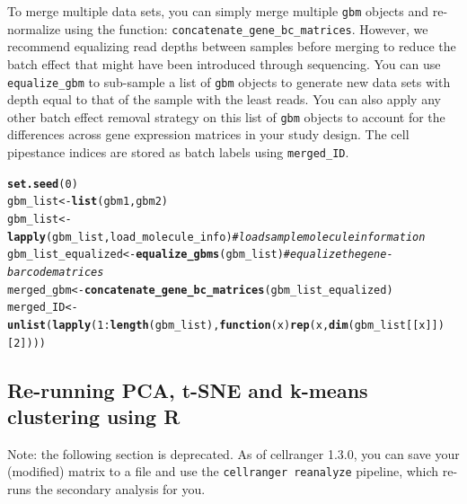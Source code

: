 \documentclass[10pt,oneside]{article}\usepackage[]{graphicx}\usepackage[]{color}
\makeatletter
\newcommand{\hlnum}[1]{\textcolor[rgb]{0.686,0.059,0.569}{#1}}%
\newcommand{\hlcom}[1]{\textcolor[rgb]{0.678,0.584,0.686}{\textit{#1}}}%
\newcommand{\hlopt}[1]{\textcolor[rgb]{0,0,0}{#1}}%
\newcommand{\hlstd}[1]{\textcolor[rgb]{0.345,0.345,0.345}{#1}}%
\newcommand{\hlkwa}[1]{\textcolor[rgb]{0.161,0.373,0.58}{\textbf{#1}}}%
\newcommand{\hlkwb}[1]{\textcolor[rgb]{0.69,0.353,0.396}{#1}}%
\newcommand{\hlkwc}[1]{\textcolor[rgb]{0.333,0.667,0.333}{#1}}%
\newcommand{\hlkwd}[1]{\textcolor[rgb]{0.737,0.353,0.396}{\textbf{#1}}}%
\newenvironment{kframe}{%
 \def\at@end@of@kframe{}%
 \ifinner\ifhmode%
  \def\at@end@of@kframe{\end{minipage}}%
  \begin{minipage}{\columnwidth}%
 \fi\fi%
 \def\FrameCommand##1{\hskip\@totalleftmargin \hskip-\fboxsep
 \colorbox{shadecolor}{##1}\hskip-\fboxsep
     \hskip-\linewidth \hskip-\@totalleftmargin \hskip\columnwidth}%
 \MakeFramed {\advance\hsize-\width
   \@totalleftmargin\z@ \linewidth\hsize
   \@setminipage}}%
 {\par\unskip\endMakeFramed%
 \at@end@of@kframe}
\newenvironment{knitrout}{}{} %
\makeatother
\begin{document}
To merge multiple data sets, you can simply merge multiple \verb!gbm! objects and re-normalize using the function: \verb!concatenate_gene_bc_matrices!. However, we recommend equalizing read depths between samples before merging to reduce the batch effect that might have been introduced through sequencing. You can use \verb!equalize_gbm! to sub-sample a list of \verb!gbm! objects to generate new data sets with depth equal to that of the sample with the least reads. You can also apply any other batch effect removal strategy on this list of \verb!gbm! objects to account for the differences across gene expression matrices in your study design. The cell pipestance indices are stored as batch labels using \verb!merged_ID!.
\begin{knitrout}
\color{fgcolor}\begin{kframe}
\begin{alltt}
\hlkwd{set.seed}\hlstd{(}\hlnum{0}\hlstd{)}
\hlstd{gbm_list} \hlkwb{<-} \hlkwd{list}\hlstd{(gbm1, gbm2)}
\hlstd{gbm_list} \hlkwb{<-} \hlkwd{lapply}\hlstd{(gbm_list,load_molecule_info)} \hlcom{# load sample molecule information}
\hlstd{gbm_list_equalized} \hlkwb{<-} \hlkwd{equalize_gbms}\hlstd{(gbm_list)}   \hlcom{# equalize the gene-barcode matrices}
\hlstd{merged_gbm} \hlkwb{<-} \hlkwd{concatenate_gene_bc_matrices}\hlstd{(gbm_list_equalized)}
\hlstd{merged_ID} \hlkwb{<-} \hlkwd{unlist}\hlstd{(}\hlkwd{lapply}\hlstd{(}\hlnum{1}\hlopt{:}\hlkwd{length}\hlstd{(gbm_list),} \hlkwa{function}\hlstd{(}\hlkwc{x}\hlstd{)} \hlkwd{rep}\hlstd{(x,}\hlkwd{dim}\hlstd{(gbm_list[[x]])[}\hlnum{2}\hlstd{])))}
\end{alltt}
\end{kframe}
\end{knitrout}

\subsection{Re-running PCA, t-SNE and k-means clustering using R}

{\color{Red}Note: the following section is deprecated. As of cellranger 1.3.0, you can save your (modified) matrix to a file and use the \verb!cellranger reanalyze! pipeline, which re-runs the secondary analysis for you.}
\end{document}
